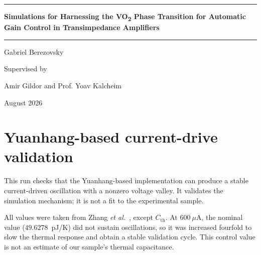 \documentclass[11pt]{article}
\newcommand{\vo}{VO\textsubscript{2}}
\begin{document}
\hypersetup{pageanchor=false}
\begin{titlepage}
  \centering
  \vspace*{0.15\textheight}
  {\color{projectblue}\rule{0.84\textwidth}{1.2pt}\par}
  \vspace{1.2cm}
  {\Huge\bfseries
    Simulations for Harnessing the \vo{} Phase Transition for Automatic Gain Control in Transimpedance Amplifiers\par
  }
  \vspace{1.2cm}
  {\color{projectblue}\rule{0.84\textwidth}{1.2pt}\par}
  \vspace{1.8cm}
  {\Large Gabriel Berezovsky\par}
  \vspace{1.2cm}
  {\Large Supervised by\par}
  \vspace{0.25cm}
  {\Large Amir Gildor and Prof. Yoav Kalcheim\par}
  \vfill
  {\large August 2026\par}
\end{titlepage}

\hypersetup{pageanchor=true}
\tableofcontents
\clearpage
{}

\section{Yuanhang-based current-drive validation}

This run checks that the Yuanhang-based implementation can produce a stable current-driven oscillation with a nonzero voltage valley. It validates the simulation mechanism; it is not a fit to the experimental sample.

All values were taken from Zhang \emph{et al.}\ \cite{zhang2024}, except $C_{\mathrm{th}}$. At $600~\mu$A, the nominal value ($49.6278$~pJ/K) did not sustain oscillations, so it was increased fourfold to slow the thermal response and obtain a stable validation cycle. This control value is not an estimate of our sample's thermal capacitance.
\end{document}
